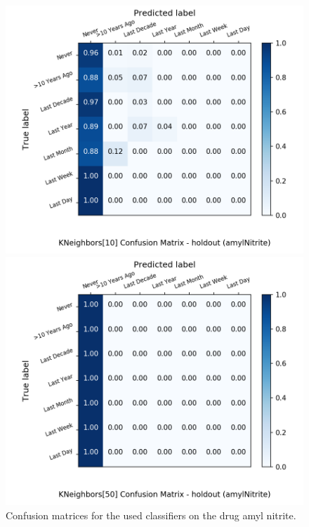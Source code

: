 \begin{figure}[H]
\begin{minipage}[b]{0.32\textwidth}
		\includegraphics[width=1.1\textwidth]{Plots/amylNitrite_KNeighbors_10_balance_False_holdout.png}
  \end{minipage}
	\begin{minipage}[b]{0.32\textwidth}
		\includegraphics[width=1.1\textwidth]{Plots/amylNitrite_KNeighbors_50_balance_False_holdout.png}
  \end{minipage}
	\caption{Confusion matrices for the used classifiers on the drug amyl nitrite.}
\end{figure}


